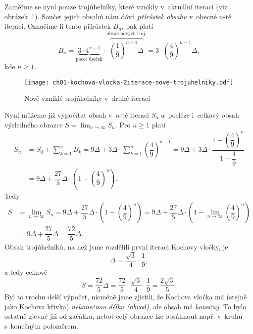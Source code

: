 Zaměřme se nyní pouze trojúhelníky, které vznikly v~aktuální iteraci (viz obrázek~\ref{fig:kochova_vlocka_2iterace_nove_trojuhelniky}). Součet jejich obsahů nám dává \emph{přírůstek obsahu} v~obecné $n$-té iteraci. Označíme-li tento přírůstek $B_n$, pak platí
\[B_n=\underbrace{3\cdot 4^{n-1}}_{\text{počet úseček}}\cdot\overbrace{\left(\dfrac{1}{9}\right)^{n-1}\Delta}^{\text{obsah nových troj.}}=3\cdot\left(\dfrac{4}{9}\right)^{n-1}\Delta,\]
kde $n\geqslant 1$.
\begin{figure}[h]
    \centering
    \texttt{[image: ch01-kochova-vlocka-2iterace-nove-trojuhelniky.pdf]}
    \caption{Nově vzniklé trojúhelníky v~druhé iteraci}
    \label{fig:kochova_vlocka_2iterace_nove_trojuhelniky}
\end{figure}
Nyní můžeme již vypočítat obsah v~$n$-té iteraci $S_n$ a~posléze i~celkový obsah výsledného obrazce $S=\lim_{n\to\infty}{S_n}$. Pro $n\geqslant 1$ platí
\begin{align*}
    S_n&=S_0+\sum_{k=1}^{n}{B_k}=9\Delta+3\Delta\cdot\sum_{k=1}^{n}{\left(\dfrac{4}{9}\right)^{k-1}}=9\Delta+3\Delta\cdot\dfrac{1-\left(\dfrac{4}{9}\right)^{n}}{1-\dfrac{4}{9}}\\
    &=9\Delta+\dfrac{27}{5}\Delta\cdot\left(1-\left(\dfrac{4}{9}\right)^n\right).
\end{align*}
Tedy
\begin{align*}
    S&=\lim_{n\to\infty}{S_n}=9\Delta+\dfrac{27}{5}\Delta\cdot\left(1-\left(\dfrac{4}{9}\right)^n\right)=9\Delta+\dfrac{27}{5}\Delta\cdot\left(1-\lim_{n\to\infty}\left(\dfrac{4}{9}\right)^n\right)\\
    &=9\Delta+\dfrac{27}{5}\Delta=\dfrac{72}{5}\Delta.
\end{align*}
Obsah trojúhelníků, na než jsme rozdělili první iteraci Kochovy vločky, je
\[\Delta=\dfrac{\sqrt{3}}{4}\cdot\dfrac{1}{9},\]
a tedy celkově
\[S=\dfrac{72}{5}\Delta=\dfrac{72}{5}\cdot\dfrac{\sqrt{3}}{4}\cdot\dfrac{1}{9}=\dfrac{2\sqrt{3}}{5}.\]
Byl to trochu delší výpočet, nicméně jsme zjistili, že Kochova vločka má (stejně jako Kochova křivka) \emph{nekonečnou délku (obvod)}, ale obsah má \emph{konečný}. To bylo ostatně zjevné již od začátku, neboť celý obrazec lze obsáhnout např. v~kruhu s~konečným poloměrem.
